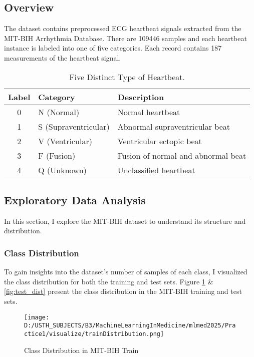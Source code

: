 \documentclass[10pt, conference]{IEEEtran}
\begin{document}
	\subsection{Overview}
	The dataset contains preprocessed ECG heartbeat signals extracted from the MIT-BIH Arrhythmia Database. There are 109446 samples and each heartbeat instance is labeled into one of five categories. Each record contains 187 measurements of the heartbeat signal.
	
	\begin{table}[h]
		\centering
		\begin{tabular}{|c|l|l|}
			\hline
			\textbf{Label} & \textbf{Category} & \textbf{Description} \\ \hline
			0 & N (Normal) & Normal heartbeat \\ \hline
			1 & S (Supraventricular) & Abnormal supraventricular beat \\ \hline
			2 & V (Ventricular) & Ventricular ectopic beat \\ \hline
			3 & F (Fusion) & Fusion of normal and abnormal beat \\ \hline
			4 & Q (Unknown) & Unclassified heartbeat \\ \hline
		\end{tabular}
		\caption{Five Distinct Type of Heartbeat.}
		\label{tab:classes}
	\end{table}
	
	\subsection{Exploratory Data Analysis}
	In this section, I explore the MIT-BIH dataset to understand its structure and distribution.
	
	\subsubsection{Class Distribution}
	To gain insights into the dataset's number of samples of each class, I visualized the class distribution for both the training and test sets. Figure \ref{fig:train_dist} \& \ref{fig:test_dist} present the class distribution in the MIT-BIH training and test sets.
	
	\begin{figure}[H]
		\centering
		\texttt{[image: D:/USTH\_SUBJECTS/B3/MachineLearningInMedicine/mlmed2025/Practice1/visualize/trainDistribution.png]}
		\caption{Class Distribution in MIT-BIH Train}
		\label{fig:train_dist}
	\end{figure}
	
\end{document}
